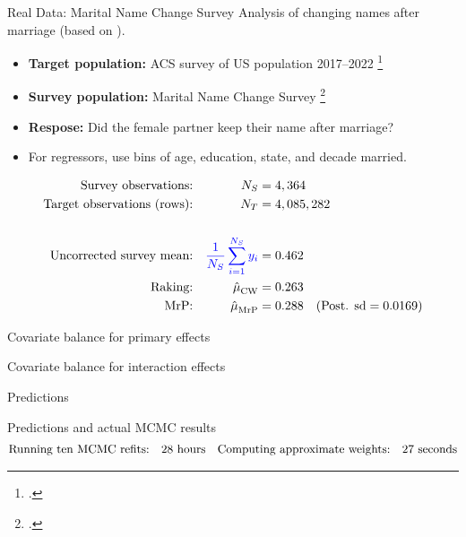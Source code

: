 
\begin{frame}{Real Data: Marital Name Change Survey}
Analysis of changing names after marriage (based on \textcite{alexander:2019:namechange}).

\begin{itemize}
    \item \textbf{Target population:} ACS survey of US population 2017--2022 \footcite{ipumsusa}
    \item \textbf{Survey population:} Marital Name Change Survey \footcite{cohen:2019:namechange}
    \item \textbf{Respose:}  Did the female partner keep their name after marriage?
    \item For regressors, use bins of age, education, state, and decade married.
\end{itemize}

$$
\begin{aligned}
    \textrm{Survey observations:} &&  {N_S} ={}& 4,364  \\
    \textrm{Target observations (rows):} &&  {N_T} ={}& 4,085,282 \\
    \\
    \textrm{Uncorrected survey mean:} && \textcolor{blue}{\frac{1}{{N_S}} \sum_{i=1}^{N_S} y_i} ={}& 0.462 \\
    \textrm{Raking:} && \hat{\mu}^{}_{\mathrm{CW}} ={}& 0.263 \\
    \textrm{MrP:} && \hat{\mu}^{}_{\mathrm{MrP}} ={}& 0.288
        \quad(\textrm{Post. sd} = 0.0169)\\
\end{aligned}
$$
%
\end{frame}


\begin{frame}{Covariate balance for primary effects}
\AlexanderImbalancePrimary{}
\end{frame}


\begin{frame}{Covariate balance for interaction effects}
\AlexanderImbalanceInteraction{}
\end{frame}




\begin{frame}[t]{Predictions}
    \AlexanderPredictionFigOne{}
\end{frame}







\begin{frame}[t]{Predictions and actual MCMC results}
    \AlexanderPredictionFigTwo{}
    \vspace{-3em}
    $$
    \begin{aligned}
        \textrm{Running ten MCMC refits:}\quad & 28 \textrm{ hours} &
        \textrm{Computing approximate weights:}\quad &27 \textrm{ seconds}\\
    \end{aligned}
    $$
\end{frame}


